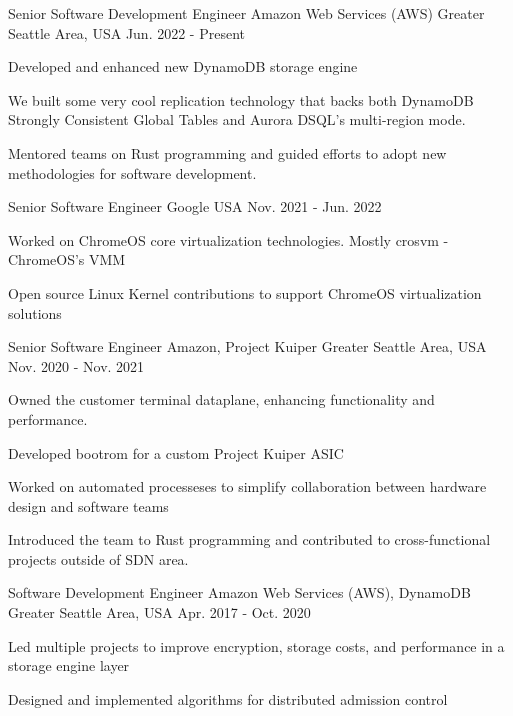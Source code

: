 \begin{cventries}
\cventry
  {Senior Software Development Engineer} %
  {Amazon Web Services (AWS)} %
  {Greater Seattle Area, USA} %
  {Jun. 2022 - Present} %
  {
    \begin{cvitems} %
      \item {Developed and enhanced new DynamoDB storage engine}
      \item {We built some very cool replication technology that backs both DynamoDB Strongly Consistent Global Tables and Aurora DSQL's multi-region mode.}
      \item {Mentored teams on Rust programming and guided efforts to adopt new methodologies for software development.}
    \end{cvitems}
  }

\cventry
  {Senior Software Engineer} %
  {Google} %
  {USA} %
  {Nov. 2021 - Jun. 2022} %
  {
    \begin{cvitems} %
      \item {Worked on ChromeOS core virtualization technologies. Mostly crosvm - ChromeOS's VMM}
      \item {Open source Linux Kernel contributions to support ChromeOS virtualization solutions}
    \end{cvitems}
  }

\cventry
  {Senior Software Engineer} %
  {Amazon, Project Kuiper} %
  {Greater Seattle Area, USA} %
  {Nov. 2020 - Nov. 2021} %
  {
    \begin{cvitems} %
      \item {Owned the customer terminal dataplane, enhancing functionality and performance.}
      \item {Developed bootrom for a custom Project Kuiper ASIC}
      \item {Worked on automated processeses to simplify collaboration between hardware design and software teams}
      \item {Introduced the team to Rust programming and contributed to cross-functional projects outside of SDN area.}
    \end{cvitems}
  }

\cventry
  {Software Development Engineer} %
  {Amazon Web Services (AWS), DynamoDB} %
  {Greater Seattle Area, USA} %
  {Apr. 2017 - Oct. 2020} %
  {
    \begin{cvitems} %
      \item {Led multiple projects to improve encryption, storage costs, and performance in a storage engine layer}
      \item {Designed and implemented algorithms for distributed admission control}
    \end{cvitems}
  }


\end{cventries}
